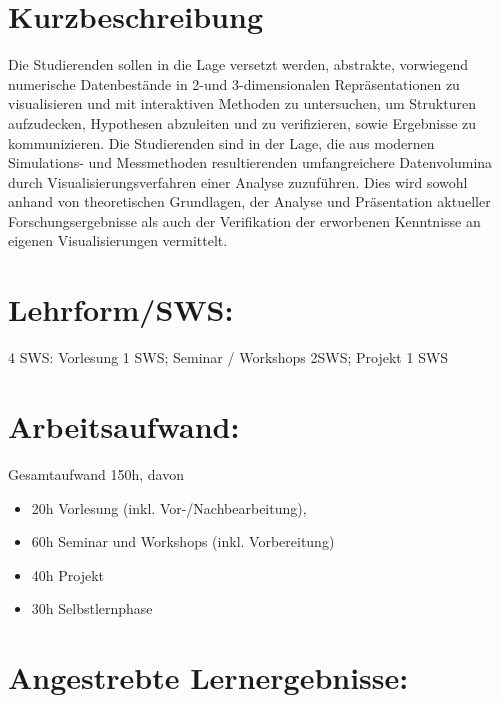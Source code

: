 \section*{Kurzbeschreibung}\label{kurzbeschreibung-9}

Die Studierenden sollen in die Lage versetzt werden, abstrakte,
vorwiegend numerische Datenbestände in 2-und 3-dimensionalen
Repräsentationen zu visualisieren und mit interaktiven Methoden zu
untersuchen, um Strukturen aufzudecken, Hypothesen abzuleiten und zu
verifizieren, sowie Ergebnisse zu kommunizieren. Die Studierenden sind
in der Lage, die aus modernen Simulations- und Messmethoden
resultierenden umfangreichere Datenvolumina durch
Visualisierungsverfahren einer Analyse zuzuführen. Dies wird sowohl
anhand von theoretischen Grundlagen, der Analyse und Präsentation
aktueller Forschungsergebnisse als auch der Verifikation der erworbenen
Kenntnisse an eigenen Visualisierungen vermittelt.

\section*{Lehrform/SWS:}\label{lehrformsws-18}

4 SWS: Vorlesung 1 SWS; Seminar / Workshops 2SWS; Projekt 1 SWS

\section*{Arbeitsaufwand:}\label{arbeitsaufwand-24}

Gesamtaufwand 150h, davon

\begin{itemize}
\tightlist
\item
  20h Vorlesung (inkl. Vor-/Nachbearbeitung),
\item
  60h Seminar und Workshops (inkl. Vorbereitung)
\item
  40h Projekt
\item
  30h Selbstlernphase
\end{itemize}

\section*{Angestrebte
Lernergebnisse:}\label{angestrebte-lernergebnisse-18}

